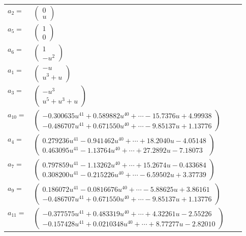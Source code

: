 \documentclass[1p]{elsarticle_modified}
\theoremstyle{definition}
\begin{document}
\begin{tabular}{m{7pt} m{180pt} m{7pt} m{180pt} }
\flushright $a_{2}=$&$\begin{pmatrix}0\\u\end{pmatrix}$ \\
\flushright $a_{5}=$&$\begin{pmatrix}1\\0\end{pmatrix}$ \\
\flushright $a_{6}=$&$\begin{pmatrix}1\\- u^2\end{pmatrix}$ \\
\flushright $a_{1}=$&$\begin{pmatrix}- u\\u^3+u\end{pmatrix}$ \\
\flushright $a_{3}=$&$\begin{pmatrix}- u^3\\u^5+u^3+u\end{pmatrix}$ \\
\flushright $a_{10}=$&$\begin{pmatrix}-0.300635 u^{41}+0.589882 u^{40}+\cdots-15.7376 u+4.99938\\-0.486707 u^{41}+0.671550 u^{40}+\cdots-9.85137 u+1.13776\end{pmatrix}$ \\
\flushright $a_{4}=$&$\begin{pmatrix}0.279236 u^{41}-0.941462 u^{40}+\cdots+18.2040 u-4.05148\\0.463095 u^{41}-1.13764 u^{40}+\cdots+27.2892 u-7.18073\end{pmatrix}$ \\
\flushright $a_{7}=$&$\begin{pmatrix}0.797859 u^{41}-1.13262 u^{40}+\cdots+15.2674 u-0.433684\\0.308200 u^{41}-0.215226 u^{40}+\cdots-6.59502 u+3.37739\end{pmatrix}$ \\
\flushright $a_{9}=$&$\begin{pmatrix}0.186072 u^{41}-0.0816676 u^{40}+\cdots-5.88625 u+3.86161\\-0.486707 u^{41}+0.671550 u^{40}+\cdots-9.85137 u+1.13776\end{pmatrix}$ \\
\flushright $a_{11}=$&$\begin{pmatrix}-0.377575 u^{41}+0.483319 u^{40}+\cdots+4.32261 u-2.55226\\-0.157428 u^{41}+0.0210348 u^{40}+\cdots+8.77277 u-2.82010\end{pmatrix}$ \\

\end{tabular}
\end{document}
